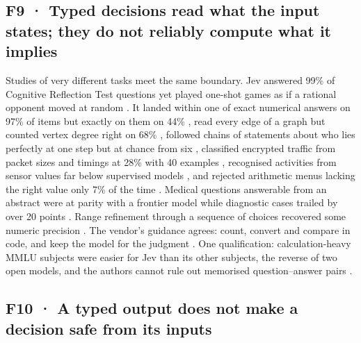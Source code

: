 \subsection{F9 · Typed decisions read what the input states; they do not reliably compute what it implies}

Studies of very different tasks meet the same boundary. Jev answered 99\% of Cognitive Reflection Test questions yet played one-shot games as if a rational opponent moved at random \citep{arxiv2610_01834}. It landed within one of exact numerical answers on 97\% of items but exactly on them on 44\% \citep{arxiv2610_03935}, read every edge of a graph but counted vertex degree right on 68\% \citep{arxiv2610_06354}, followed chains of statements about who lies perfectly at one step but at chance from six \citep{arxiv2610_07730}, classified encrypted traffic from packet sizes and timings at 28\% with 40 examples \citep{arxiv2610_00376}, recognised activities from sensor values far below supervised models \citep{arxiv2609_36154}, and rejected arithmetic menus lacking the right value only 7\% of the time \citep{arxiv2609_39496}. Medical questions answerable from an abstract were at parity with a frontier model while diagnostic cases trailed by over 20 points \citep{arxiv2609_34024}. Range refinement through a sequence of choices recovered some numeric precision \citep{arxiv2609_28587}. The vendor's guidance agrees: count, convert and compare in code, and keep the model for the judgment \citep{typesafe2026jaggedness}. One qualification: calculation-heavy MMLU subjects were easier for Jev than its other subjects, the reverse of two open models, and the authors cannot rule out memorised question–answer pairs \citep{arxiv2609_37647}.

\subsection{F10 · A typed output does not make a decision safe from its inputs}

